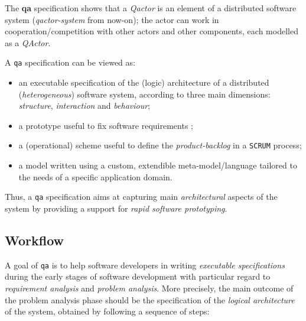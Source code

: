  
 

The \textbf{qa} specification shows that a \textit{Qactor} is an element of a distributed software system (\textit{qactor-system} from now-on); the actor can work in cooperation/competition with other actors and other components, each modelled as a \textit{QActor}.

A  \texttt{qa} specification can be viewed as:
\begin{itemize}
\item an executable specification of the (logic) architecture of a distributed (\textit{heterogeneous}) software system, according to three main dimensions: \textit{structure}, \textit{interaction} and \textit{behaviour};
\item a prototype useful to fix software requirements ;
\item a (operational) scheme useful to define the \textit{product-backlog} in a \texttt{SCRUM} process;
\item a model written using a custom, extendible meta-model/language tailored to the needs of a specific application domain.
\end{itemize}

Thus, a \texttt{qa} specification aims at capturing main \textit{architectural} aspects of the system by providing a support for \textit{rapid software prototyping}.

\subsection{Workflow}

A goal of  \texttt{qa} is  to help software developers in writing \textit{executable specifications} during the early stages of software development with particular regard to \textit{requirement analysis} and \textit{problem analysis}. More precisely, the main outcome of the problem analysis phase should be the specification of the \textit{logical architecture} of the system, obtained by following a sequence of steps:

